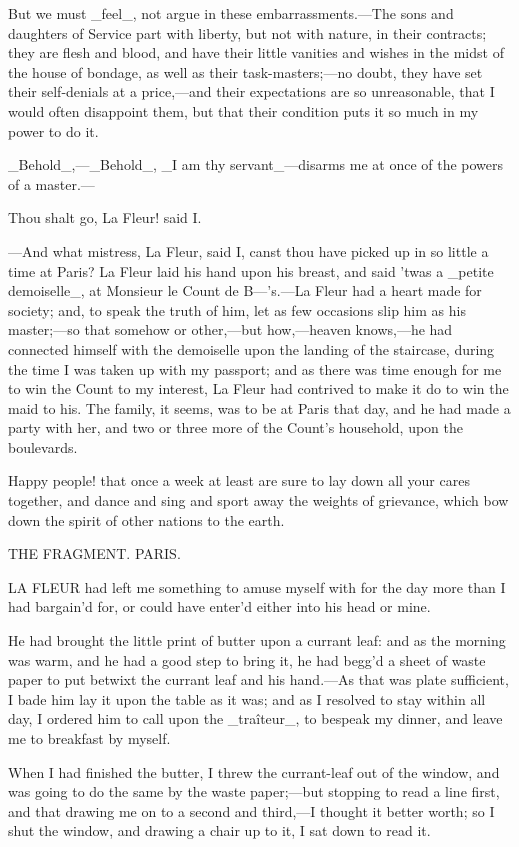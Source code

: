 \documentclass[twoside]{article}
\begin{document}
But we must _feel_, not argue in these embarrassments.—The sons and
daughters of Service part with liberty, but not with nature, in their
contracts; they are flesh and blood, and have their little vanities and
wishes in the midst of the house of bondage, as well as their
task-masters;—no doubt, they have set their self-denials at a price,—and
their expectations are so unreasonable, that I would often disappoint
them, but that their condition puts it so much in my power to do it.

_Behold_,—_Behold_, _I am thy servant_—disarms me at once of the powers
of a master.—

Thou shalt go, La Fleur! said I.

—And what mistress, La Fleur, said I, canst thou have picked up in so
little a time at Paris?  La Fleur laid his hand upon his breast, and said
’twas a _petite demoiselle_, at Monsieur le Count de B—’s.—La Fleur had a
heart made for society; and, to speak the truth of him, let as few
occasions slip him as his master;—so that somehow or other,—but
how,—heaven knows,—he had connected himself with the demoiselle upon the
landing of the staircase, during the time I was taken up with my
passport; and as there was time enough for me to win the Count to my
interest, La Fleur had contrived to make it do to win the maid to his.
The family, it seems, was to be at Paris that day, and he had made a
party with her, and two or three more of the Count’s household, upon the
boulevards.

Happy people! that once a week at least are sure to lay down all your
cares together, and dance and sing and sport away the weights of
grievance, which bow down the spirit of other nations to the earth.




THE FRAGMENT.
PARIS.


LA FLEUR had left me something to amuse myself with for the day more than
I had bargain’d for, or could have enter’d either into his head or mine.

He had brought the little print of butter upon a currant leaf: and as the
morning was warm, and he had a good step to bring it, he had begg’d a
sheet of waste paper to put betwixt the currant leaf and his hand.—As
that was plate sufficient, I bade him lay it upon the table as it was;
and as I resolved to stay within all day, I ordered him to call upon the
_traîteur_, to bespeak my dinner, and leave me to breakfast by myself.

When I had finished the butter, I threw the currant-leaf out of the
window, and was going to do the same by the waste paper;—but stopping to
read a line first, and that drawing me on to a second and third,—I
thought it better worth; so I shut the window, and drawing a chair up to
it, I sat down to read it.
\end{document}

